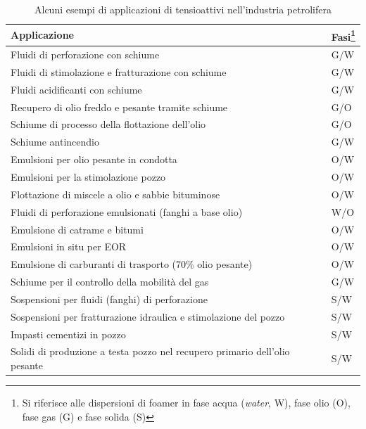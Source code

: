 \begin{table}[htbp]
    \small
    \centering
    \caption{Alcuni esempi di applicazioni di tensioattivi nell'industria petrolifera \parencite{schramm2006emulsions}}
    \label{tab:surfactantapplications}
\begin{tabular}{p{}p{}}
\hline
{\bf Applicazione}                                                         & {\textbf{Fasi}\footnote{Si riferisce alle dispersioni di foamer in fase acqua (\textit{water}, W), fase olio (O), fase gas (G) e fase solida (S)}}           \\ \hline
Fluidi di perforazione con schiume                                         & G/W                    \\
Fluidi di stimolazione e fratturazione con schiume                         & G/W                    \\
Fluidi acidificanti con schiume                                            & G/W                    \\
Recupero di olio freddo e pesante tramite schiume                          & G/O                    \\
Schiume di processo della flottazione dell'olio                            & G/O                    \\
Schiume antincendio                                                        & G/W                    \\
Emulsioni per olio pesante in condotta                                     & O/W                    \\
Emulsioni per la stimolazione pozzo                                        & O/W                    \\
Flottazione di miscele a olio e sabbie bituminose                          & O/W                    \\
Fluidi di perforazione emulsionati (fanghi a base olio)                    & W/O                    \\
Emulsione di catrame e bitumi                                              & O/W                    \\
Emulsioni in situ per EOR                                                  & O/W                    \\
Emulsione di carburanti di trasporto (70\% olio pesante)                   & O/W                    \\
Schiume per il controllo della mobilità del gas                            & G/W                    \\
Sospensioni per fluidi (fanghi) di perforazione                            & S/W                    \\
Sospensioni per fratturazione idraulica e stimolazione del pozzo           & S/W                    \\
Impasti cementizi in pozzo                                                 & S/W                    \\
Solidi di produzione a testa pozzo nel recupero primario dell'olio pesante & S/W                    \\ \hline
\end{tabular}
\end{table}

